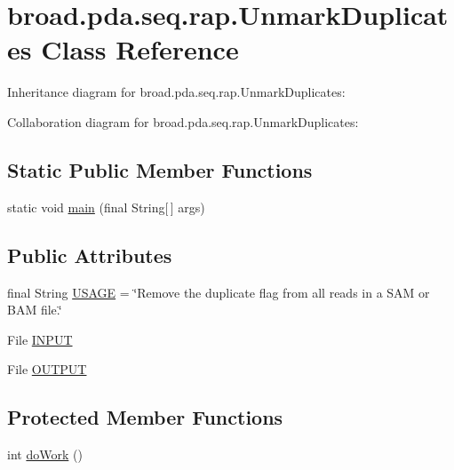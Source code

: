 \hypertarget{classbroad_1_1pda_1_1seq_1_1rap_1_1_unmark_duplicates}{\section{broad.\+pda.\+seq.\+rap.\+Unmark\+Duplicates Class Reference}
\label{classbroad_1_1pda_1_1seq_1_1rap_1_1_unmark_duplicates}
}


Inheritance diagram for broad.\+pda.\+seq.\+rap.\+Unmark\+Duplicates\+:


Collaboration diagram for broad.\+pda.\+seq.\+rap.\+Unmark\+Duplicates\+:
\subsection*{Static Public Member Functions}
\begin{DoxyCompactItemize}
\item 
static void \hyperlink{classbroad_1_1pda_1_1seq_1_1rap_1_1_unmark_duplicates_ae32ac88c212bb9d42f4864b307580685}{main} (final String\mbox{[}$\,$\mbox{]} args)
\end{DoxyCompactItemize}
\subsection*{Public Attributes}
\begin{DoxyCompactItemize}
\item 
final String \hyperlink{classbroad_1_1pda_1_1seq_1_1rap_1_1_unmark_duplicates_a9a7c5588a9a90060bf4e9a794ffe0e7d}{U\+S\+A\+G\+E} = \char`\"{}Remove the duplicate flag from all reads in a S\+A\+M or B\+A\+M file.\char`\"{}
\item 
File \hyperlink{classbroad_1_1pda_1_1seq_1_1rap_1_1_unmark_duplicates_af779c21595731e988fb21cefff20353f}{I\+N\+P\+U\+T}
\item 
File \hyperlink{classbroad_1_1pda_1_1seq_1_1rap_1_1_unmark_duplicates_a6feeeb53aaf5750bba0b03f196e0c59a}{O\+U\+T\+P\+U\+T}
\end{DoxyCompactItemize}
\subsection*{Protected Member Functions}
\begin{DoxyCompactItemize}
\item 
int \hyperlink{classbroad_1_1pda_1_1seq_1_1rap_1_1_unmark_duplicates_a76eed0f5fafa889864268f5ab69fecfc}{do\+Work} ()
\end{DoxyCompactItemize}


